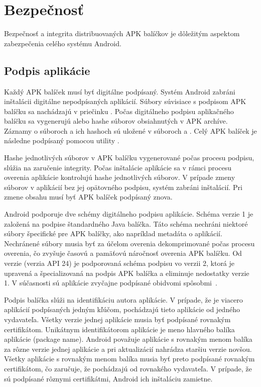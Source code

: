 \section{Bezpečnosť}

Bezpečnosť a integrita distribuovaných APK balíčkov je dôležitým aspektom zabezpečenia celého systému Android.

\subsection{Podpis aplikácie}

Každý APK balíček musí byť digitálne podpísaný. Systém Android zabráni inštalácii digitálne nepodpísaných aplikácií. 
Súbory súvisiace s podpisom APK balíčku sa nachádzajú v priečinku . Počas digitálneho podpisu aplikačného balíčku sa vygenerujú  alebo  hashe súborov obsiahnutých v APK archíve. Záznamy o súboroch a ich hashoch sú uložené v súboroch  a . Celý APK balíček je následne podpísaný pomocou utility . 

Hashe jednotlivých súborov v APK balíčku vygenerované počas procesu podpisu, slúžia na zaručenie integrity. Počas inštalácie aplikácie sa v rámci procesu overenia aplikácie kontrolujú hashe jednotlivých súborov. V prípade zmeny súborov v aplikácií bez jej opätovného podpisu, systém zabráni inštalácií. Pri zmene obsahu musí byť APK balíček podpísaný znova. 

Android podporuje dve schémy digitálneho podpisu aplikácie. Schéma verzie 1 je založená na podpise štandardného Java balíčka. Táto schéma nechráni niektoré súbory špecifické pre APK balíčky, ako napríklad metadáta o aplikácií. Nechránené súbory musia byť za účelom overenia dekomprimované počas procesu overenia, čo zvyšuje časovú a pamäťovú náročnosť overenia APK balíčku.  Od verzie  (verzia API 24) je podporovaná schéma podpisu vo verzii 2, ktorá je upravená a špecializovaná na podpis APK balíčka a eliminuje nedostatky verzie 1. V súčasnosti sú aplikácie zvyčajne podpísané obidvomi spôsobmi~\cite{NT0FrzQIkOAYbG2Ga}.

Podpis balíčka slúži na identifikáciu autora aplikácie. V prípade, že je viacero aplikácií podpísaných jedným kľúčom, pochádzajú tieto aplikácie od jedného vydavateľa. 
Všetky verzie jednej aplikácie musia byť podpísané rovnakým certifikátom. Unikátnym identifikátorom aplikácie je meno hlavného balíka aplikácie (package name). Android považuje aplikácie s rovnakým menom balíka za rôzne verzie jednej aplikácie a pri aktualizácií nahrádza staršiu verzie novšou. Všetky aplikácie s rovnakým menom balíka musia byť preto podpísané rovnakým certifikátom, čo zaručuje, že pochádzajú od rovnakého vydavateľa.  V prípade, že sú podpísané rôznymi certifikátmi, Android ich inštaláciu zamietne. 

